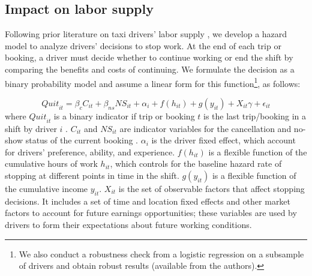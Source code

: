 \documentclass[reviewmode,AEJ]{AEA}
\begin{document}
\subsection{Impact on labor supply}
Following prior literature on taxi drivers' labor supply \citep{farber2005tomorrow,farber2015you,agarwal2015singaporean}%
, we develop a hazard model to analyze drivers' decisions to stop work. At the end of each trip or booking, a driver must decide whether
to continue working or end the shift by comparing the benefits and costs of continuing. 
We formulate the decision as a  binary probability model 
and assume a linear form for this function\footnote{
We also conduct a robustness check from a logistic regression on a subsample of drivers and obtain robust results (available from the authors).}, as follows:

\begin{equation}
\label{eq:quit}
{Quit}_{it} = \beta_{c}C_{it} + \beta_{ns} {NS}_{it} + \alpha_i +  f(h_{it}) + g(y_{it}) + X_{it}\gamma  +  \epsilon_{it}
\end{equation}
where %
${Quit}_{it}$ is a binary indicator 
 if trip or booking $t$ is the last trip/booking in a shift by driver $i$%
. $C_{it}$ and ${NS}_{it}$ are indicator variables for
the cancellation and no-show status of the current booking%
. $\alpha_i$ is the driver fixed effect, 
which account for drivers' preference, ability, and experience.
$f(h_{it})$ is a flexible function of the cumulative hours of work $h_{it}$, which controls for the baseline 
hazard rate of stopping at different points in time in the shift. $g(y_{it})$ is a flexible function 
of the cumulative income $y_{it}$.
$X_{it}$ is the set of observable factors that affect stopping decisions.  
It includes a set of time and location fixed effects and other market factors to account for 
future earnings opportunities; these variables are used by drivers to form their expectations 
about future working conditions.
\end{document}
